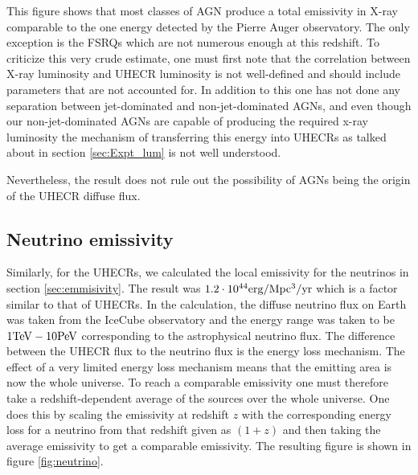 This figure shows that most classes of AGN produce a total emissivity in X-ray comparable to the one energy detected by the Pierre Auger observatory. The only exception is the FSRQs which are not numerous enough at this redshift. 
To criticize this very crude estimate, one must first note that the correlation between X-ray luminosity and UHECR luminosity is not well-defined and should include parameters that are not accounted for.
In addition to this one has not done any separation between jet-dominated and non-jet-dominated AGNs, and even though our non-jet-dominated AGNs are capable of producing the required x-ray luminosity
the mechanism of transferring this energy into UHECRs as talked about in section \ref{sec:Expt_lum} is not well understood. 


Nevertheless, the result does not rule out the possibility of AGNs being the origin of the UHECR diffuse flux. 


\subsection{Neutrino emissivity}
Similarly, for the UHECRs, we calculated the local emissivity for the neutrinos in section \ref{sec:emmisivity}. The result was $1.2 \cdot 10^{44} \rm erg/\rm Mpc^3\rm /yr$ which is a factor similar to that of UHECRs.
In the calculation, the diffuse neutrino flux on Earth was taken from the IceCube observatory \cite{Abbasi_2022} and the energy range was taken to be $1\rm TeV - 10\rm PeV$ corresponding to the astrophysical neutrino flux.
The difference between the UHECR flux to the neutrino flux is the energy loss mechanism. The effect of a very limited energy loss mechanism means that the emitting area is now the whole universe. To reach a comparable emissivity one must therefore take a redshift-dependent average of the sources over the whole universe.
One does this by scaling the emissivity at redshift $z$ with the corresponding energy loss for a neutrino from that redshift given as $(1+z)$ and then taking the average emissivity to get a comparable emissivity.
The resulting figure is shown in figure \ref{fig:neutrino}.

